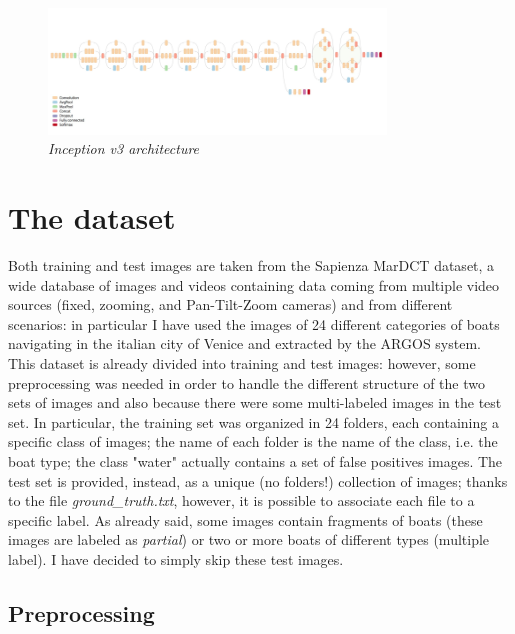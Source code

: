 \documentclass[12pt]{article}
\begin{document}
\begin{figure}[!ht]
	\centering 
	\includegraphics[width=0.8\textwidth]{inceptionv3.png} 
	\caption{\textit{Inception v3 architecture}} 
	\label{fig:inceptionv3}
\end{figure}

\section{The dataset}
\label{sec:dataset}
Both training and test images are taken from the Sapienza MarDCT dataset, a wide database of images and videos containing data coming from multiple video sources (fixed, zooming, and Pan-Tilt-Zoom cameras) and from different scenarios: in particular I have used the images of 24 different categories of boats navigating in the italian city of Venice and extracted by the ARGOS system. This dataset is already divided into training and test images: however, some preprocessing was needed in order to handle the different structure of the two sets of images and also because there were some multi-labeled images in the test set. In particular, the training set was organized in 24 folders, each containing a specific class of images; the name of each folder is the name of the class, i.e. the boat type; the class "water" actually contains a set of false positives images. The test set is provided, instead, as a unique (no folders!) collection of images; thanks to the file \textit{ground\_truth.txt}, however, it is possible to associate each file to a specific label. As already said, some images contain fragments of boats (these images are labeled as \textit{partial}) or two or more boats of different types (multiple label). I have decided to simply skip these test images.

\subsection{Preprocessing}
\label{sec:preprocessing}
\end{document}
